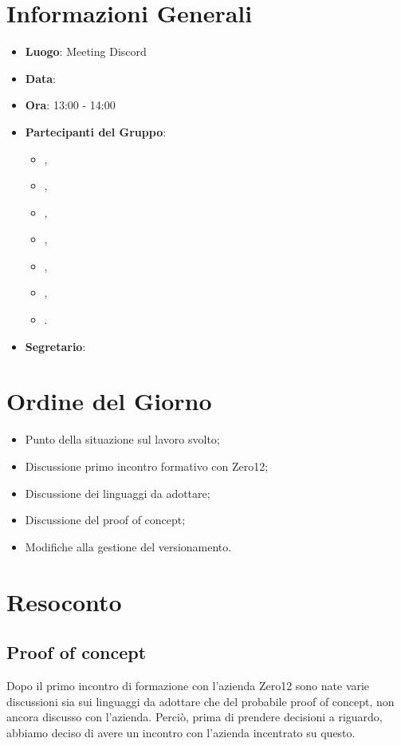 \section{Informazioni Generali}

\begin{itemize}
\item{\textbf{Luogo}}: Meeting Discord
\item{\textbf{Data}}: \D{}
\item{\textbf{Ora}}: 13:00 - 14:00
\item{\textbf{Partecipanti del Gruppo}}: 
	\begin{itemize}
	\item{\EP{},} 
	\item{\FP{},}
	\item{\GC{},}
	\item{\LW{},}
	\item{\MB{},}
	\item{\MG{},}
	\item{\PV{}.}
	\end{itemize} 
\item{\textbf{Segretario}}: \PV{}	
\end{itemize}

\section{Ordine del Giorno}
\begin{itemize}
\item{Punto della situazione sul lavoro svolto;}
\item{Discussione primo incontro formativo con Zero12;}
\item{Discussione dei linguaggi da adottare;}
\item{Discussione del proof of concept;}
\item{Modifiche alla gestione del versionamento.}
\end{itemize}

\section{Resoconto}

\subsection{Proof of concept}
Dopo il primo incontro di formazione con l'azienda Zero12 sono nate varie discussioni sia sui linguaggi da adottare che del probabile proof of concept, non ancora discusso con l'azienda. Perciò, prima di prendere decisioni a riguardo, abbiamo deciso di avere un incontro con l'azienda incentrato su questo.


